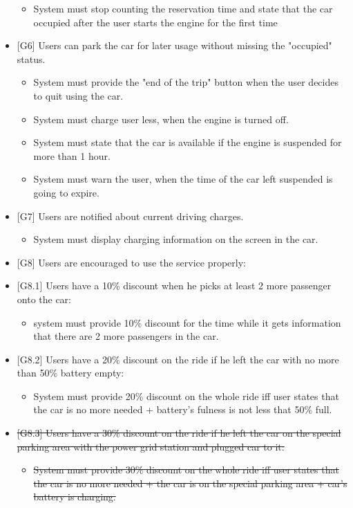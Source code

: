 \documentclass[12pt, letterpaper]{article}
\begin{document}
\begin{itemize}
\begin{itemize}
		\item System must stop counting the reservation time and state that the car occupied after
		the user starts the engine for the first time
	\end{itemize}
	\item {[G6]} Users can park the car for later usage without missing the "occupied" status.
	\begin{itemize}
		\item System must provide the "end of the trip" button when the user decides to quit using
		the car.
		\item System must charge user less, when the engine is turned off.
		\item System must state that the car is available if the engine is suspended for more than 1
		hour.
		\item System must warn the user, when the time of the car left suspended is going to expire.
	\end{itemize}
	\item {[G7]} Users are notified about current driving charges.
	\begin{itemize}
		\item System must display charging information on the screen in the car.
	\end{itemize}
	\item {[G8]} Users are encouraged to use the service properly:
	\item {[G8.1]} Users have a 10\% discount when he picks at least 2 more passenger onto the car:
	\begin{itemize}
		\item system must provide 10\% discount for the time while it gets information that there are
		2 more passengers in the car.
	\end{itemize}
	\item {[G8.2]} Users have a 20\% discount on the ride if he left the car with no more than 50\%
	battery empty:
	\begin{itemize}
		\item System must provide 20\% discount on the whole ride iff user states that the car is no
		more needed + battery’s fulness is not less that 50\% full.
	\end{itemize}
	\item \sout{[G8.3] Users have a 30\% discount on the ride if he left the car on the special parking
	area with the power grid station and plugged car to it:}
	\begin{itemize}
		\item \sout {System must provide 30\% discount on the whole ride iff user states that the car is no
		more needed + the car is on the special parking area + car’s battery is charging.}
	\end{itemize}
\end{itemize}
\end{document}
